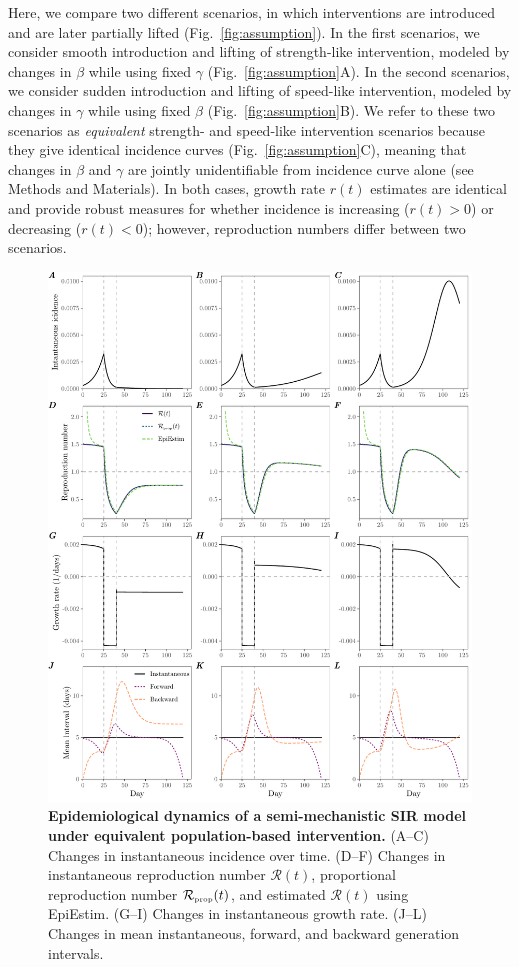 \documentclass[12pt]{article}
\newcommand{\fref}[1]{Fig.~\ref{fig:#1}}
\newcommand{\RR}{\ensuremath{{\mathcal R}}\xspace}
\newcommand{\tsub}[2]{#1_{{\textrm{\tiny #2}}}}
\begin{document}
Here, we compare two different scenarios, in which interventions are introduced and are later partially lifted (\fref{assumption}).
In the first scenarios, we consider smooth introduction and lifting of strength-like intervention, modeled by changes in $\beta$ while using fixed $\gamma$ (\fref{assumption}A).
In the second scenarios, we consider sudden introduction and lifting of speed-like intervention, modeled by changes in $\gamma$ while using fixed $\beta$ (\fref{assumption}B).
We refer to these two scenarios as \emph{equivalent} strength- and speed-like intervention scenarios because they give identical incidence curves (\fref{assumption}C), meaning that changes in $\beta$ and $\gamma$ are jointly unidentifiable from incidence curve alone (see Methods and Materials).
In both cases, growth rate $r(t)$ estimates are identical and provide robust measures for whether incidence is increasing ($r(t) > 0$) or decreasing ($r(t) < 0$); however, reproduction numbers differ between two scenarios.

\begin{figure}
\includegraphics[width=\textwidth]{figure_sir_beta.pdf}
\caption{
\textbf{Epidemiological dynamics of a semi-mechanistic SIR model under equivalent population-based intervention.}
(A--C) Changes in instantaneous incidence over time.
(D--F) Changes in instantaneous reproduction number $\RR(t)$, proportional reproduction number $\tsub{\RR}{prop}(t)$, and estimated $\RR(t)$ using EpiEstim.
(G--I) Changes in instantaneous growth rate.
(J--L) Changes in mean instantaneous, forward, and backward generation intervals.
}
\label{fig:sir_beta}
\end{figure}
\end{document}
